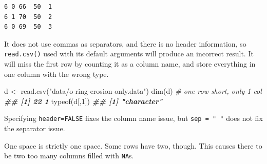 \documentclass[
  12pt,
  krantz2]{krantz}
\makeatletter
\newenvironment{Shaded}{\begin{snugshade}}{\end{snugshade}}
\newcommand{\AttributeTok}[1]{\textcolor[rgb]{0.61,0.61,0.61}{#1}}
\newcommand{\CommentTok}[1]{\textcolor[rgb]{0.37,0.37,0.37}{\textit{#1}}}
\newcommand{\ConstantTok}[1]{\textcolor[rgb]{0,0,0}{#1}}
\newcommand{\DecValTok}[1]{\textcolor[rgb]{0.06,0.06,0.06}{#1}}
\newcommand{\DocumentationTok}[1]{\textcolor[rgb]{0.37,0.37,0.37}{\textbf{\textit{#1}}}}
\newcommand{\FunctionTok}[1]{\textcolor[rgb]{0,0,0}{#1}}
\newcommand{\NormalTok}[1]{#1}
\newcommand{\OtherTok}[1]{\textcolor[rgb]{0.37,0.37,0.37}{#1}}
\newcommand{\StringTok}[1]{\textcolor[rgb]{0.5,0.5,0.5}{#1}}
\newenvironment{kframe}{%
\medskip{}
\setlength{\fboxsep}{.8em}
 \def\at@end@of@kframe{}%
 \ifinner\ifhmode%
  \def\at@end@of@kframe{\end{minipage}}%
  \begin{minipage}{\columnwidth}%
 \fi\fi%
 \def\FrameCommand##1{\hskip\@totalleftmargin \hskip-\fboxsep
 \colorbox{shadecolor}{##1}\hskip-\fboxsep
     \hskip-\linewidth \hskip-\@totalleftmargin \hskip\columnwidth}%
 \MakeFramed {\advance\hsize-\width
   \@totalleftmargin\z@ \linewidth\hsize
   \@setminipage}}%
 {\par\unskip\endMakeFramed%
 \at@end@of@kframe}
\renewenvironment{Shaded}{\begin{kframe}}{\end{kframe}}
\makeatother
\begin{document}
\begin{verbatim}
6 0 66  50  1
6 1 70  50  2
6 0 69  50  3
\end{verbatim}

It does not use commas as separators, and there is no header information, so \texttt{read.csv()} used with its default arguments will produce an incorrect result. It will miss the first row by counting it as a column name, and store everything in one column with the wrong type.

\begin{Shaded}
\begin{Highlighting}[]
\NormalTok{d }\OtherTok{\textless{}{-}} \FunctionTok{read.csv}\NormalTok{(}\StringTok{"data/o{-}ring{-}erosion{-}only.data"}\NormalTok{)}
\FunctionTok{dim}\NormalTok{(d) }\CommentTok{\# one row short, only 1 col}
\DocumentationTok{\#\# [1] 22  1}
\FunctionTok{typeof}\NormalTok{(d[,}\DecValTok{1}\NormalTok{])}
\DocumentationTok{\#\# [1] "character"}
\end{Highlighting}
\end{Shaded}

Specifying \texttt{header=FALSE} fixes the column name issue, but \texttt{sep\ =\ "\ "} does not fix the separator issue.

\begin{Shaded}
\end{Shaded}

One space is strictly one space. Some rows have two, though. This causes there to be two too many columns filled with \texttt{NA}s.
\end{document}

